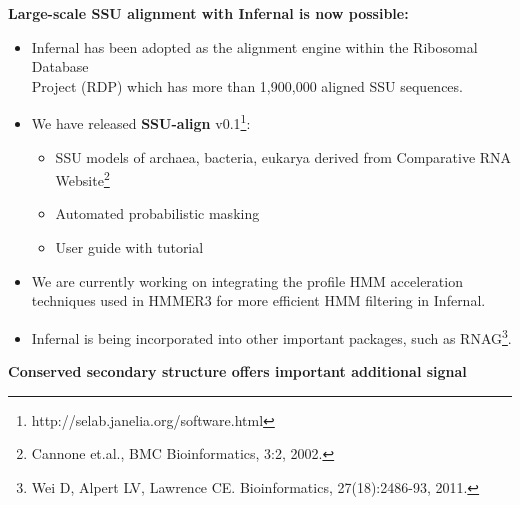 \documentclass[landscape]{slides}
\begin{document}
\begin{slide}
\begin{center}
\textbf{Large-scale SSU alignment with Infernal is now possible:}
\end{center}
\medskip

\small
\begin{itemize}
\item Infernal has been adopted as the alignment engine within the
  Ribosomal Database \\ Project (RDP) which has more than 1,900,000 aligned
  SSU sequences.

\item We have released {\bf SSU-align} v0.1\footnote{http://selab.janelia.org/software.html}:
  \begin{itemize}
    \item SSU models of archaea, bacteria, eukarya derived from
      Comparative RNA Website\footnote{Cannone et.al., BMC Bioinformatics, 3:2, 2002.}
    \item Automated probabilistic masking
    \item User guide with tutorial
  \end{itemize}
\end{itemize}

\normalsize
{}

\small
\begin{itemize}
\item We are currently working on integrating the profile HMM
  acceleration techniques used in HMMER3 for more efficient HMM
  filtering in Infernal.
\item Infernal is being incorporated into other important packages,
  such as RNAG\footnote{Wei D, Alpert LV, Lawrence CE. Bioinformatics,
  27(18):2486-93, 2011.}.
\end{itemize}


\vfill
\end{slide}
\begin{slide}
\vfill
\end{slide}
\begin{slide}
\begin{center}
\textbf{Conserved secondary structure offers important additional signal}
\medskip


\end{center}

\vfill
\end{slide}
\end{document}

